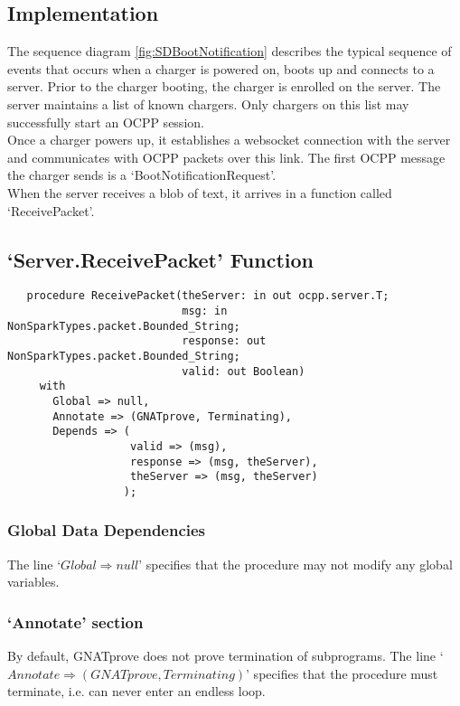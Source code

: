 \documentclass[12pt,openany,a4paper]{book}
\begin{document}
\subsection{Implementation}
The sequence diagram \ref{fig:SDBootNotification} describes the typical sequence of events that occurs when a charger is powered on, boots up and connects to a server. Prior to the charger booting, the charger is enrolled on the server. The server maintains a list of known chargers. Only chargers on this list may successfully start an OCPP session.\\
Once a charger powers up, it establishes a websocket connection with the server and communicates with OCPP packets over this link. The first OCPP message the charger sends is a `BootNotificationRequest'.\\
When the server receives a blob of text, it arrives in a function called `ReceivePacket'.

\pagebreak
\subsection{`Server.ReceivePacket' Function}

\begin{verbatim}
   procedure ReceivePacket(theServer: in out ocpp.server.T;
                           msg: in NonSparkTypes.packet.Bounded_String;
                           response: out NonSparkTypes.packet.Bounded_String;
                           valid: out Boolean)
     with
       Global => null,
       Annotate => (GNATprove, Terminating),
       Depends => (
                   valid => (msg),
                   response => (msg, theServer),
                   theServer => (msg, theServer)
                  );
\end{verbatim}

\subsubsection{Global Data Dependencies}
The line `$Global \Rightarrow null$' specifies that the procedure may not modify any global variables. 
\subsubsection{`Annotate' section}
By default, GNATprove does not prove termination of subprograms. The line `$Annotate \Rightarrow (GNATprove, Terminating)$' specifies that the procedure must terminate, i.e. can never enter an endless loop. 
\end{document}
